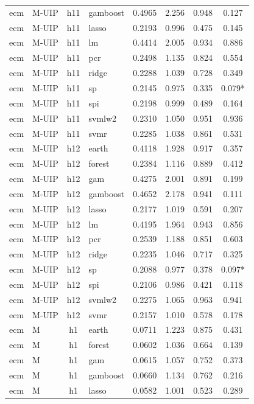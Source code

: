 \begin{ThreePartTable}
\begin{longtable}[t]{llclcccc}
ecm & M-UIP & h11 & gamboost & 0.4965 & 2.256 & 0.948 & 0.127\\
ecm & M-UIP & h11 & lasso & 0.2193 & 0.996 & 0.475 & 0.145\\
ecm & M-UIP & h11 & lm & 0.4414 & 2.005 & 0.934 & 0.886\\
ecm & M-UIP & h11 & pcr & 0.2498 & 1.135 & 0.824 & 0.554\\
ecm & M-UIP & h11 & ridge & 0.2288 & 1.039 & 0.728 & 0.349\\
ecm & M-UIP & h11 & sp & 0.2145 & 0.975 & 0.335 & 0.079*\\
ecm & M-UIP & h11 & spi & 0.2198 & 0.999 & 0.489 & 0.164\\
ecm & M-UIP & h11 & svmlw2 & 0.2310 & 1.050 & 0.951 & 0.936\\
ecm & M-UIP & h11 & svmr & 0.2285 & 1.038 & 0.861 & 0.531\\
\addlinespace
ecm & M-UIP & h12 & earth & 0.4118 & 1.928 & 0.917 & 0.357\\
ecm & M-UIP & h12 & forest & 0.2384 & 1.116 & 0.889 & 0.412\\
ecm & M-UIP & h12 & gam & 0.4275 & 2.001 & 0.891 & 0.199\\
ecm & M-UIP & h12 & gamboost & 0.4652 & 2.178 & 0.941 & 0.111\\
ecm & M-UIP & h12 & lasso & 0.2177 & 1.019 & 0.591 & 0.207\\
ecm & M-UIP & h12 & lm & 0.4195 & 1.964 & 0.943 & 0.856\\
ecm & M-UIP & h12 & pcr & 0.2539 & 1.188 & 0.851 & 0.603\\
ecm & M-UIP & h12 & ridge & 0.2235 & 1.046 & 0.717 & 0.325\\
ecm & M-UIP & h12 & sp & 0.2088 & 0.977 & 0.378 & 0.097*\\
ecm & M-UIP & h12 & spi & 0.2106 & 0.986 & 0.421 & 0.118\\
ecm & M-UIP & h12 & svmlw2 & 0.2275 & 1.065 & 0.963 & 0.941\\
ecm & M-UIP & h12 & svmr & 0.2157 & 1.010 & 0.578 & 0.178\\
\addlinespace
ecm & M & h1 & earth & 0.0711 & 1.223 & 0.875 & 0.431\\
ecm & M & h1 & forest & 0.0602 & 1.036 & 0.664 & 0.139\\
ecm & M & h1 & gam & 0.0615 & 1.057 & 0.752 & 0.373\\
ecm & M & h1 & gamboost & 0.0660 & 1.134 & 0.762 & 0.216\\
ecm & M & h1 & lasso & 0.0582 & 1.001 & 0.523 & 0.289\\

\end{longtable}
\end{ThreePartTable}
